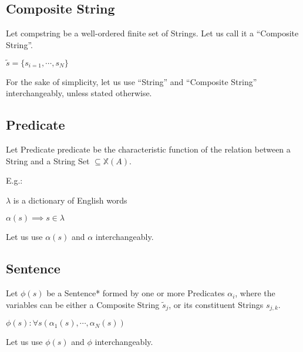 \documentclass{article}
\begin{document}
\subsection{Composite String}

Let \gls{compstring} be a well-ordered finite set of Strings. Let us call it a ``Composite String''.

\begin{center}
 $\tilde s = \{s_{i=1}, \cdots, s_N \}$
\end{center}

For the sake of simplicity, let us use ``String'' and ``Composite String'' interchangeably, unless stated otherwise.



\subsection{Predicate}

Let Predicate \gls{predicate} be the characteristic function of the relation between a String and a String Set $\subseteq \mathbb{X}(A)$.

E.g.:
\begin{center}
$\lambda$ is a dictionary of English words

$\alpha(s) \implies s \in \lambda$
\end{center}

Let us use $\alpha(s)$ and $\alpha$ interchangeably.

\subsection{Sentence}

Let $\phi(s)$ be a Sentence* formed by one or more Predicates $\alpha_i$, where the variables can be either a Composite String $\tilde s_j$, or its
constituent Strings $s_{j,k}$.

\begin{center}
 $\phi(s) : \forall s (\alpha_1( s), \cdots, \alpha_N(s))$
\end{center}

Let us use $\phi(s)$ and $\phi$ interchangeably.
\end{document}
